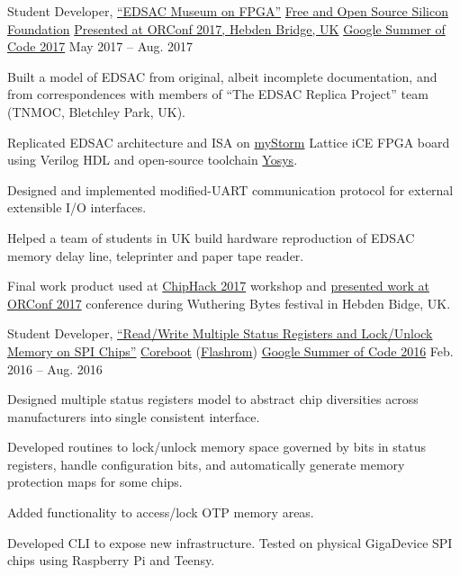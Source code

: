 \begin{cvexperience}
\cvposition
	{Student Developer, \href{https://github.com/librecores/gsoc-museum-edsac}{``EDSAC Museum on FPGA''}} %
	{\href{https://fossi-foundation.org}{Free and Open Source Silicon Foundation}} %
	{\href{https://orconf.org/2017/\#edsac}{Presented at ORConf 2017, Hebden Bridge, UK}} %
	{\href{https://summerofcode.withgoogle.com/archive/2017/projects/6470218444439552/}{Google Summer of Code 2017}} %
	{May 2017 -- Aug. 2017} %
	{\begin{cvitems} %
		\item {Built a model of EDSAC from original, albeit incomplete documentation, and from correspondences with members of ``The EDSAC Replica Project'' team (TNMOC, Bletchley Park, UK).}
		\item {Replicated EDSAC architecture and ISA on \href{https://mystorm.uk/}{myStorm} Lattice iCE FPGA board using Verilog HDL and open-source toolchain \href{http://www.clifford.at/yosys/}{Yosys}.}
		\item {Designed and implemented modified-UART communication protocol for external extensible I/O interfaces.}
		\item {Helped a team of students in UK build hardware reproduction of EDSAC memory delay line, teleprinter and paper tape reader.}
		\item {Final work product used at \href{http://chiphack.org/chiphack-2017.html}{ChipHack 2017} workshop and \href{https://youtu.be/EZkJOyOcYiY}{presented work at ORConf 2017} conference during Wuthering Bytes festival in Hebden Bidge, UK.}
	\end{cvitems}}

\cvposition
	{Student Developer, \href{https://drive.google.com/drive/u/1/folders/0B-Cccp-WWmeuUlh5M3pxT0cyQm8}{``Read/Write Multiple Status Registers and Lock/Unlock Memory on SPI Chips''}} %
	{\href{https://www.coreboot.org}{Coreboot} (\href{https://www.flashrom.org/Flashrom}{Flashrom})} %
	{} %
	{\href{https://summerofcode.withgoogle.com/archive/2016/projects/5439533130711040/}{Google Summer of Code 2016}} %
	{Feb. 2016 -- Aug. 2016} %
	{\begin{cvitems} %
		\item {Designed multiple status registers model to abstract chip diversities across manufacturers into single consistent interface.}
		\item {Developed routines to lock/unlock memory space governed by bits in status registers, handle configuration bits, and automatically generate memory protection maps for some chips.}
		\item {Added functionality to access/lock OTP memory areas.}
		\item {Developed CLI to expose new infrastructure. Tested on physical GigaDevice SPI chips using Raspberry Pi and Teensy.}
	\end{cvitems}}


\end{cvexperience}
